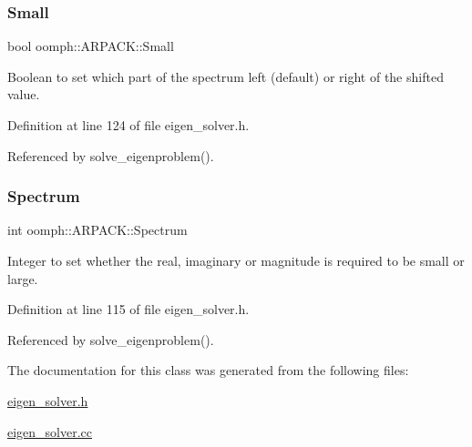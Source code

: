 \mbox{\label{classoomph_1_1ARPACK_aa92552280868d74242f71c6f98db79e8}} 
\subsubsection{\texorpdfstring{Small}{Small}}
{\footnotesize\ttfamily bool oomph\+::\+A\+R\+P\+A\+C\+K\+::\+Small\hspace{0.3cm}{\ttfamily [private]}}



Boolean to set which part of the spectrum left (default) or right of the shifted value. 



Definition at line 124 of file eigen\+\_\+solver.\+h.



Referenced by solve\+\_\+eigenproblem().

\mbox{\label{classoomph_1_1ARPACK_a212ff2ad05b73b8f1e4f0d8d10733015}} 
\subsubsection{\texorpdfstring{Spectrum}{Spectrum}}
{\footnotesize\ttfamily int oomph\+::\+A\+R\+P\+A\+C\+K\+::\+Spectrum\hspace{0.3cm}{\ttfamily [private]}}



Integer to set whether the real, imaginary or magnitude is required to be small or large. 



Definition at line 115 of file eigen\+\_\+solver.\+h.



Referenced by solve\+\_\+eigenproblem().



The documentation for this class was generated from the following files\+:\begin{DoxyCompactItemize}
\item 
\hyperlink{eigen__solver_8h}{eigen\+\_\+solver.\+h}\item 
\hyperlink{eigen__solver_8cc}{eigen\+\_\+solver.\+cc}\end{DoxyCompactItemize}
